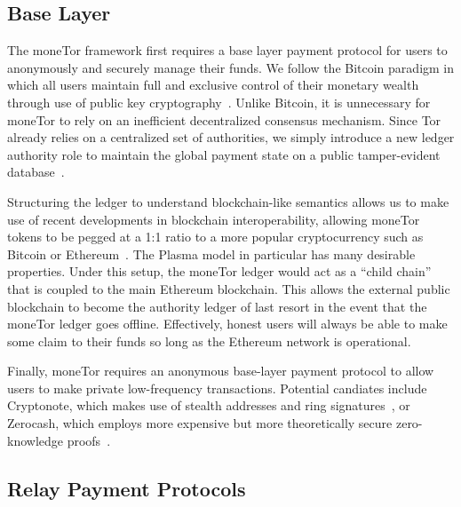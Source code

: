 
\subsection{Base Layer}

The moneTor framework first requires a base layer payment protocol for users to
anonymously and securely manage their funds. We follow the Bitcoin paradigm in
which all users maintain full and exclusive control of their monetary wealth
through use of public key cryptography~\cite{nakamoto2008bitcoin}. Unlike
Bitcoin, it is unnecessary for moneTor to rely on an inefficient decentralized
consensus mechanism. Since Tor already relies on a centralized set of
authorities, we simply introduce a new ledger authority role to maintain the
global payment state on a public tamper-evident
database~\cite{crosby2009efficient}.

Structuring the ledger to understand blockchain-like semantics allows us to make
use of recent developments in blockchain interoperability, allowing moneTor
tokens to be pegged at a 1:1 ratio to a more popular cryptocurrency such as
Bitcoin or Ethereum~\cite{back2014enabling, poon2017plasma}. The Plasma model in
particular has many desirable properties. Under this setup, the moneTor ledger
would act as a ``child chain'' that is coupled to the main Ethereum
blockchain. This allows the external public blockchain to become the authority
ledger of last resort in the event that the moneTor ledger goes
offline. Effectively, honest users will always be able to make some claim to
their funds so long as the Ethereum network is operational.

Finally, moneTor requires an anonymous base-layer payment protocol to allow
users to make private low-frequency transactions. Potential candiates include
Cryptonote, which makes use of stealth addresses and ring
signatures~\cite{van2013cryptonote}, or Zerocash, which employs more expensive
but more theoretically secure zero-knowledge proofs~\cite{sasson2014zerocash}.

\subsection{Relay Payment Protocols}


